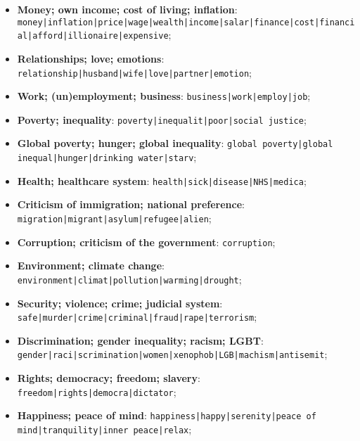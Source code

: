 \begin{itemize} 
 \item \textbf{ Money; own income; cost of living; inflation}: \texttt{money\allowbreak|inflation\allowbreak|price\allowbreak|wage\allowbreak|wealth\allowbreak|income\allowbreak|salar\allowbreak|finance\allowbreak|cost\allowbreak|financial\allowbreak|afford\allowbreak|illionaire\allowbreak|expensive};
 \item \textbf{Relationships; love; emotions}: \texttt{relationship\allowbreak|husband\allowbreak|wife\allowbreak|love\allowbreak|partner\allowbreak|emotion};
 \item \textbf{Work; (un)employment; business}: \texttt{business\allowbreak|work\allowbreak|employ\allowbreak|job};
 \item \textbf{Poverty; inequality}: \texttt{poverty\allowbreak|inequalit\allowbreak|poor\allowbreak|social justice};
 \item \textbf{Global poverty; hunger; global inequality}: \texttt{global poverty\allowbreak|global inequal\allowbreak|hunger\allowbreak|drinking water\allowbreak|starv};
 \item \textbf{Health; healthcare system}: \texttt{health\allowbreak|sick\allowbreak|disease\allowbreak|NHS\allowbreak|medica};
 \item \textbf{Criticism of immigration; national preference}: \texttt{migration\allowbreak|migrant\allowbreak|asylum\allowbreak|refugee\allowbreak|alien};
 \item \textbf{Corruption; criticism of the government}: \texttt{corruption};
 \item \textbf{Environment; climate change}: \texttt{environment\allowbreak|climat\allowbreak|pollution\allowbreak|warming\allowbreak|drought};
 \item \textbf{Security; violence; crime; judicial system}: \texttt{safe\allowbreak|murder\allowbreak|crime\allowbreak|criminal\allowbreak|fraud\allowbreak|rape\allowbreak|terrorism};
 \item \textbf{Discrimination; gender inequality; racism; LGBT}: \texttt{gender\allowbreak|raci\allowbreak|scrimination\allowbreak|women\allowbreak|xenophob\allowbreak|LGB\allowbreak|machism\allowbreak|antisemit};
 \item \textbf{Rights; democracy; freedom; slavery}: \texttt{freedom\allowbreak|rights\allowbreak|democra\allowbreak|dictator};
 \item \textbf{Happiness; peace of mind}: \texttt{happiness\allowbreak|happy\allowbreak|serenity\allowbreak|peace of mind\allowbreak|tranquility\allowbreak|inner peace\allowbreak|relax};

\end{itemize}
